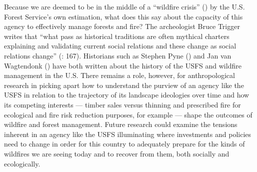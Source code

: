 \documentclass[
]{article}
\begin{document}
Because we are deemed to be in the middle of a ``wildfire crisis'' () by the U.S. Forest Service's own estimation, what does this say about the capacity of this agency to effectively manage forests and fire? The archeologist Bruce Trigger writes that ``what pass as historical traditions are often mythical charters explaining and validating current social relations and these change as social relations change'' (: 167). Historians such as Stephen Pyne () and Jan van Wagtendonk () have both written about the history of the USFS and wildfire management in the U.S. There remains a role, however, for anthropological research in picking apart how to understand the purview of an agency like the USFS in relation to the trajectory of its landscape ideologies over time and how its competing interests --- timber sales versus thinning and prescribed fire for ecological and fire risk reduction purposes, for example --- shape the outcomes of wildfire and forest management. Future research could examine the tensions inherent in an agency like the USFS illuminating where investments and policies need to change in order for this country to adequately prepare for the kinds of wildfires we are seeing today and to recover from them, both socially and ecologically.
\end{document}
